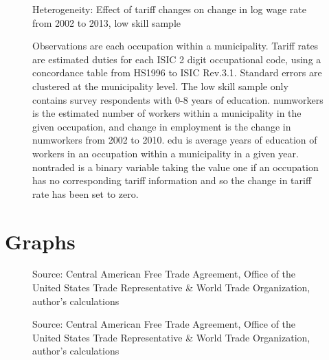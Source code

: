 \documentclass[12pt]{article}
\begin{document}
\begin{landscape}
\begin{figure}[H]
\begin{center}
Heterogeneity: Effect of tariff changes on change in log wage rate from 2002 to 2013, low skill sample

\caption{\label{fig:Table5}}
\end{center}
\small{Observations are each occupation within a municipality. 
Tariff rates are estimated duties for each ISIC 2 digit occupational code,
using a concordance table from HS1996 to ISIC Rev.3.1. Standard errors are clustered at the 
municipality level. The low skill sample only 
contains survey respondents with 0-8 years of education. numworkers is the estimated
number of workers within a municipality in the given occupation, and change in employment
is the change in numworkers from 2002 to 2010. edu is average years of education 
of workers in an occupation within a municipality in a given year. nontraded is a binary variable
taking the value one if an occupation has no corresponding tariff information and so the change in
tariff rate has been set to zero.}
\end{figure}
\end{landscape}

\section{Graphs}
\label{sec:Graphs}

\begin{figure}[H]
% 
\caption{\label{fig:Graph1}}
Source: Central American Free Trade Agreement, Office of the United States Trade Representative \&
World Trade Organization, author's calculations
\end{figure}

\begin{figure}[H]
%
\caption{\label{fig:Graph2}}
Source: Central American Free Trade Agreement, Office of the United States Trade Representative \&
World Trade Organization, author's calculations
\end{figure}
\end{document}
